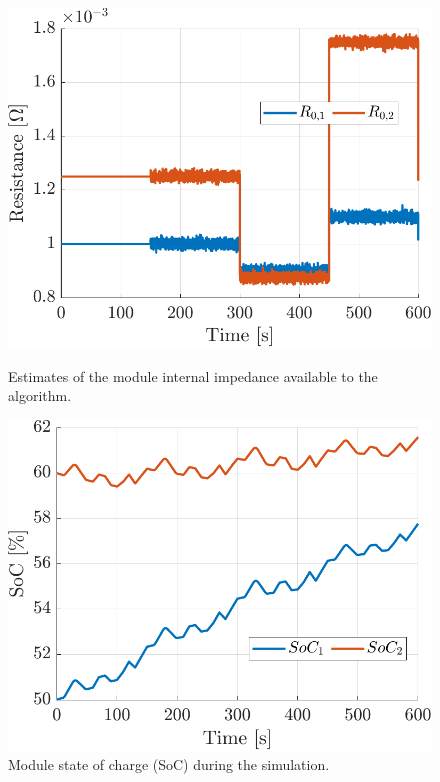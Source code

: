 \begin{figure}[b]
\centering
\begin{minipage}{0.49\textwidth}
    \centering
    \includegraphics[width=\linewidth]{figures/13/ff-R.pdf}
    \caption{Estimates of the module internal impedance available to the algorithm.}
    \label{fig:13-R}
\end{minipage}
\hfill
\begin{minipage}{0.49\textwidth}
    \centering
    \includegraphics[width=\linewidth]{figures/13/ff-SoC.pdf}
    \caption{Module state of charge (SoC) during the simulation.}
    \label{fig:13-SoC}
\end{minipage}
\end{figure}

